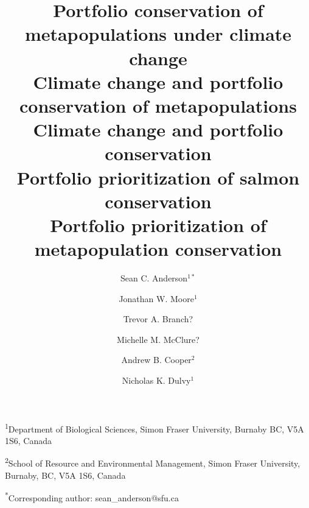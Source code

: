 \documentclass[12pt]{article}
\title{Portfolio conservation of metapopulations under climate change\\Climate 
  change and portfolio conservation of metapopulations\\Climate change and 
  portfolio conservation\\Portfolio prioritization of salmon 
  conservation\\Portfolio prioritization of metapopulation conservation}
\author{Sean C. Anderson$^{1*}$ \and Jonathan W. Moore$^1$ \and Trevor A. 
  Branch? \and Michelle M. McClure? \and Andrew B. Cooper$^2$ \and Nicholas K.  
  Dulvy$^1$}
\date{}
\begin{document}
\maketitle

\noindent
  \textsuperscript{1}Department of Biological Sciences, Simon Fraser
  University, Burnaby BC, V5A 1S6, Canada

\noindent
	\textsuperscript{2}School of Resource and Environmental Management, Simon
  Fraser University, Burnaby, BC, V5A 1S6, Canada

\noindent
	\textsuperscript{*}Corresponding author: sean\_anderson@sfu.ca

\clearpage




\renewcommand{\thetable}{S\arabic{table}}
\setcounter{table}{0} %

\renewcommand{\thefigure}{S\arabic{figure}}
\renewcommand{\figurename}{Fig.}
\setcounter{figure}{0}  %



\end{document}
